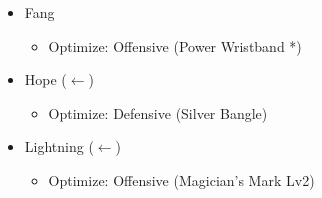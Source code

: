 \begin{menu}
\begin{itemize}
\begin{itemize}
			\end{itemize}
			\equip
			\begin{itemize}
				\item Fang
				      \begin{itemize}
					      \item Optimize: Offensive (Power Wristband *)
				      \end{itemize}
				\item Hope ($\leftarrow$)
				      \begin{itemize}
					      \item Optimize: Defensive (Silver Bangle)
				      \end{itemize}
				\item Lightning ($\leftarrow$)
				      \begin{itemize}
					      \item Optimize: Offensive (Magician's Mark Lv2)
				      \end{itemize}
			\end{itemize}
		\end{itemize}
	\end{menu}

	\renewcommand{\first}{[1] Aggression (\com/\com/\rav)}
	\renewcommand{\second}{[2] Relentless Assault (\com/\rav/\rav)}
	\renewcommand{\third}{[3] Smart Bomb (\sab/\rav/\rav)}
	\renewcommand{\fourth}{[4] Mystic Tower (\sen/\rav/\rav)}
	\renewcommand{\fifth}{[5] Guerilla (\sab/\rav/\syn)}
	\renewcommand{\sixth}{[6] Relentless Assault (\com/\rav/\rav)}

